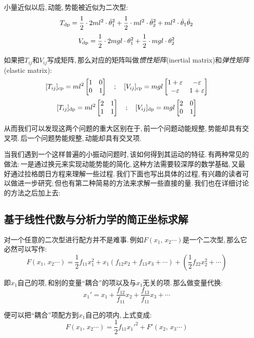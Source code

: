 小量近似以后,\,动能,\,势能被近似为二次型:
\[T_{\rm dp}=\frac{1}{2}\cdot 2ml^2\cdot\dot{\theta}_1^2+\frac{1}{2}\cdot ml^2\cdot\dot{\theta}_2^2+ml^2\cdot\dot{\theta}_1\dot{\theta}_2\]
\[V_{\rm dp}=\frac{1}{2}\cdot 2mgl\cdot{\theta}_1^2+\frac{1}{2}\cdot mgl\cdot{\theta}_2^2\]

如果把$T_{ij}$和$V_{ij}$写成矩阵,\,那么对应的矩阵叫做\emph{惯性矩阵}(inertial matrix)和\emph{弹性矩阵}(elastic matrix):
\[[T_{ij}]_{\rm cp}=ml^2\begin{bmatrix} 1&0\\ 0&1\end{bmatrix}\quad;\quad [V_{ij}]_{\rm cp}=mgl \begin{bmatrix} 1+\varepsilon&-\varepsilon\\ -\varepsilon &1+\varepsilon\end{bmatrix}\]
\[[T_{ij}]_{\rm dp}=ml^2\begin{bmatrix} 2&1\\ 1&1\end{bmatrix}\quad;\quad [V_{ij}]_{\rm dp}=mgl \begin{bmatrix} 2&0\\ 0&1\end{bmatrix}\]

从而我们可以发现这两个问题的重大区别在于,\,前一个问题动能规整,\,势能却具有交叉项.\,后一个问题势能规整,\,动能却具有交叉项.

当我们遇到一个这样普遍的小振动问题时,\,该如何得到其运动的特征.\,有两种常见的做法:\,一是通过换元来实现动能势能的简化,\,这种方法需要较深厚的数学基础,\,又最好通过拉格朗日方程来理解一些过程.\,我们下面也写出具体的过程,\,有兴趣的读者可以做进一步研究;\,但也有第二种简易的方法来求解一些直接的量.\,我们也在详细讨论的方法之后加上去:

\subsection{基于线性代数与分析力学的简正坐标求解}

对一个任意的二次型进行配方并不是难事.\,例如$F(x_1,\,x_2\cdots)$是一个二次型,\,那么它必然可以写作:
\[F(x_1,\,x_2\cdots)=\frac{1}{2}f_{11}x_1^2+x_1(f_{12}x_2+f_{13}x_3+\cdots)+(\frac{1}{2}f_{22}x_2^2+\cdots)\]

即$x_1$自己的项,\,和别的变量``耦合''的项以及与$x_1$无关的项.\,那么做变量代换:
\[x_1'=x_1+\frac{f_{12}}{f_{11}}x_2+\frac{f_{13}}{f_{11}}x_3+\cdots\]

便可以把``耦合''项配方到$x_1$自己的项内,\,上式变成:
\[F(x_1,\,x_2\cdots)=\frac{1}{2}f_{11}x_1'^2+F'(x_2,\,x_3\cdots)\]

